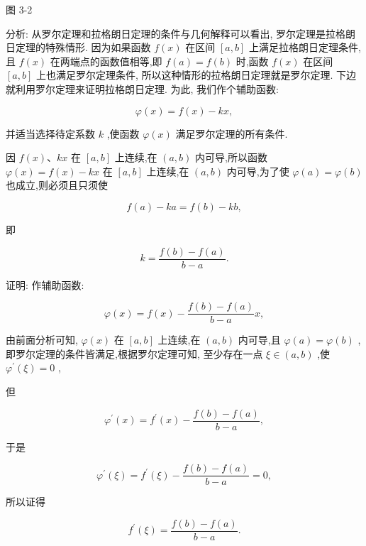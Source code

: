 \documentclass[lang=cn,newtx,10pt,scheme=chinese]{elegantbook}
\begin{document}
图 3-2

分析: 从罗尔定理和拉格朗日定理的条件与几何解释可以看出, 罗尔定理是拉格朗日定理的特殊情形. 因为如果函数 \(f\left( x\right)\) 在区间 \(\left\lbrack {a,b}\right\rbrack\) 上满足拉格朗日定理条件,且 \(f\left( x\right)\) 在两端点的函数值相等,即 \(f\left( a\right) = f\left( b\right)\) 时,函数 \(f\left( x\right)\) 在区间 \(\left\lbrack {a,b}\right\rbrack\) 上也满足罗尔定理条件, 所以这种情形的拉格朗日定理就是罗尔定理. 下边就利用罗尔定理来证明拉格朗日定理. 为此, 我们作个辅助函数:

\[
\varphi \left( x\right) = f\left( x\right) - {kx},
\]

并适当选择待定系数 \(k\) ,使函数 \(\varphi \left( x\right)\) 满足罗尔定理的所有条件.

因 \(f\left( x\right) \text{、}{kx}\) 在 \(\left\lbrack {a,b}\right\rbrack\) 上连续,在 \(\left( {a,b}\right)\) 内可导,所以函数 \(\varphi \left( x\right) = f\left( x\right) - {kx}\) 在 \(\left\lbrack {a,b}\right\rbrack\) 上连续,在 \(\left( {a,b}\right)\) 内可导,为了使 \(\varphi \left( a\right) = \varphi \left( b\right)\) 也成立,则必须且只须使

\[
f\left( a\right) - {ka} = f\left( b\right) - {kb},
\]

即

\[
k = \frac{f\left( b\right) - f\left( a\right) }{b - a}.
\]

证明: 作辅助函数:

\[
\varphi \left( x\right) = f\left( x\right) - \frac{f\left( b\right) - f\left( a\right) }{b - a}x,
\]

由前面分析可知, \(\varphi \left( x\right)\) 在 \(\left\lbrack {a,b}\right\rbrack\) 上连续,在 \(\left( {a,b}\right)\) 内可导,且 \(\varphi \left( a\right) = \varphi \left( b\right)\) ,即罗尔定理的条件皆满足,根据罗尔定理可知, 至少存在一点 \(\xi \in \left( {a,b}\right)\) ,使 \({\varphi }^{\prime }\left( \xi \right) = 0\) ,

但

\[
{\varphi }^{\prime }\left( x\right) = {f}^{\prime }\left( x\right) - \frac{f\left( b\right) - f\left( a\right) }{b - a},
\]

于是

\[
{\varphi }^{\prime }\left( \xi \right) = {f}^{\prime }\left( \xi \right) - \frac{f\left( b\right) - f\left( a\right) }{b - a} = 0,
\]

所以证得

\[
{f}^{\prime }\left( \xi \right) = \frac{f\left( b\right) - f\left( a\right) }{b - a}.
\]
\end{document}
